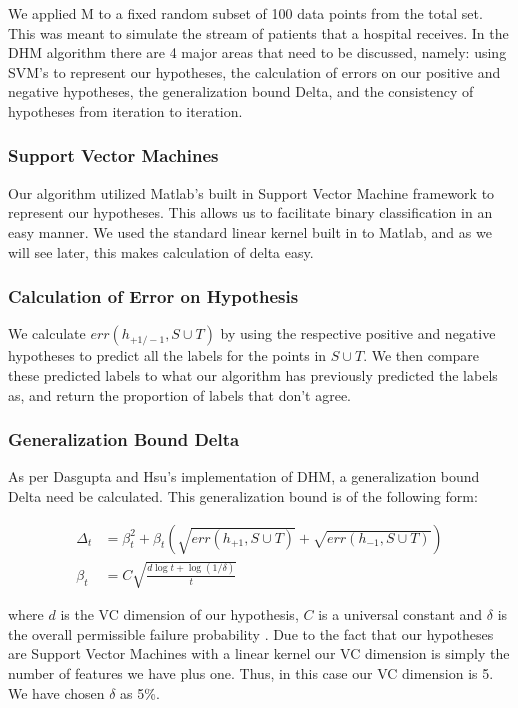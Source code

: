 \documentclass[12pt]{article}
\begin{document}
We applied 
M to a fixed random subset of 100 data points from the total set. This was meant to simulate the stream of patients that a hospital receives. In the DHM algorithm there are 4 major areas that need to be discussed, namely: using SVM's to represent our hypotheses, the calculation of errors on our positive and negative hypotheses, the generalization bound Delta, and the consistency of hypotheses from iteration to iteration.

\subsubsection{Support Vector Machines}
Our algorithm utilized Matlab's built in Support Vector Machine framework to represent our hypotheses. This allows us to facilitate binary classification in an easy manner. We used the standard linear kernel built in to Matlab, and as we will see later, this makes calculation of delta easy.

\subsubsection{Calculation of Error on Hypothesis}
We calculate $err(h_{+1/-1},S\cup T)$ by using the respective positive and negative hypotheses to predict all the labels for the points in $S\cup T$. We then compare these predicted labels to what our algorithm has previously predicted the labels as, and return the proportion of labels that don't agree.

\subsubsection{Generalization Bound Delta}
As per Dasgupta and Hsu's implementation of DHM, a generalization bound Delta need be calculated. This generalization bound is of the following form:

\begin{align*}
\Delta_t &= \beta_t^2+\beta_t(\sqrt{err(h_{+1},S\cup T)}+\sqrt{err(h_{-1}, S\cup T)})\\
\beta_t&= C\sqrt{\frac{d \log t + \log(1/\delta)}{t}}
\end{align*}

where $d$ is the VC dimension of our hypothesis, $C$ is a universal constant and $\delta$ is the overall permissible failure probability \cite{DH}. Due to the fact that our hypotheses are Support Vector Machines with a linear kernel our VC dimension is simply the number of features we have plus one. Thus, in this case our VC dimension is 5. We have chosen $\delta$ as 5\%. 
\end{document}
